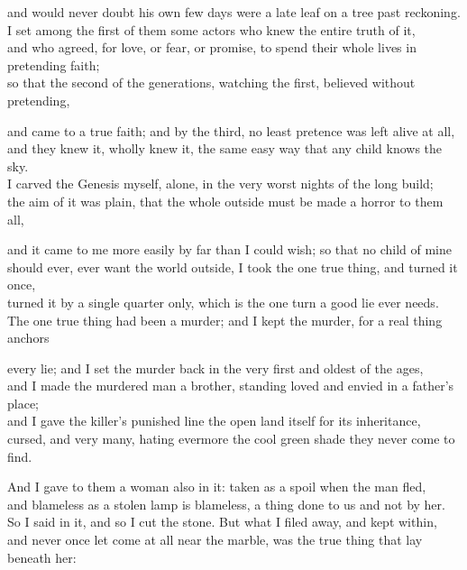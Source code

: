 \begin{scripture}
and would never doubt his own few days were a late leaf on a tree past reckoning. \\
I set among the first of them some actors who knew the entire truth of it, \\
and who agreed, for love, or fear, or promise, to spend their whole lives in pretending faith; \\
so that the second of the generations, watching the first, believed without pretending, \\
\medskip

and came to a true faith; and by the third, no least pretence was left alive at all, \\
and they knew it, wholly knew it, the same easy way that any child knows the sky. \\
I carved the Genesis myself, alone, in the very worst nights of the long build; \\
the aim of it was plain, that the whole outside must be made a horror to them all, \\
\medskip

and it came to me more easily by far than I could wish; so that no child of mine \\
should ever, ever want the world outside, I took the one true thing, and turned it once, \\
turned it by a single quarter only, which is the one turn a good lie ever needs. \\
The one true thing had been a murder; and I kept the murder, for a real thing anchors \\
\medskip

every lie; and I set the murder back in the very first and oldest of the ages, \\
and I made the murdered man a brother, standing loved and envied in a father's place; \\
and I gave the killer's punished line the open land itself for its inheritance, \\
cursed, and very many, hating evermore the cool green shade they never come to find. \\
\medskip

And I gave to them a woman also in it: taken as a spoil when the man fled, \\
and blameless as a stolen lamp is blameless, a thing done to us and not by her. \\
So I said in it, and so I cut the stone. But what I filed away, and kept within, \\
and never once let come at all near the marble, was the true thing that lay beneath her: \\
\medskip


\end{scripture}
